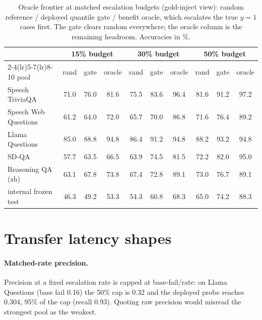 \begin{table}[h]
\centering\footnotesize
\setlength{\tabcolsep}{4.5pt}
\caption{Oracle frontier at matched escalation budgets (gold-inject
view): random reference / deployed quantile gate / benefit oracle,
which escalates the true $y{=}1$ cases first. The gate clears random
everywhere; the oracle column is the remaining headroom. Accuracies
in \%.}
\label{tab:oracle}
\begin{tabular}{lccccccccc}
\toprule
& \multicolumn{3}{c}{15\% budget} & \multicolumn{3}{c}{30\% budget} & \multicolumn{3}{c}{50\% budget} \\
\cmidrule(lr){2-4}\cmidrule(lr){5-7}\cmidrule(lr){8-10}
pool & rand & gate & oracle & rand & gate & oracle & rand & gate & oracle \\
\midrule
Speech TriviaQA & 71.0 & 76.0 & 81.6 & 75.5 & 83.6 & 96.4 & 81.6 & 91.2 & 97.2 \\
Speech Web Questions & 61.2 & 64.0 & 72.0 & 65.7 & 70.0 & 86.8 & 71.6 & 76.4 & 89.2 \\
Llama Questions & 85.0 & 88.8 & 94.8 & 86.4 & 91.2 & 94.8 & 88.2 & 93.2 & 94.8 \\
SD-QA & 57.7 & 63.5 & 66.5 & 63.9 & 74.5 & 81.5 & 72.2 & 82.0 & 95.0 \\
Reasoning QA (zh) & 63.1 & 67.8 & 73.8 & 67.4 & 72.8 & 89.1 & 73.0 & 76.7 & 89.1 \\
\midrule
internal frozen test & 46.3 & 49.2 & 53.3 & 54.3 & 60.8 & 68.3 & 65.0 & 74.2 & 88.3 \\
\bottomrule
\end{tabular}
\end{table}

\section{Transfer latency shapes}
\label{app:transferdetail}

\paragraph{Matched-rate precision.} Precision at a fixed escalation
rate is capped at base-fail/rate: on Llama Questions (base fail 0.16)
the 50\% cap is 0.32 and the deployed probe reaches 0.304, 95\% of
the cap (recall 0.93). Quoting raw precision would misread the
strongest pool as the weakest.

